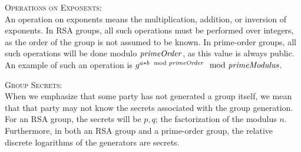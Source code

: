 \textsc{Operations on Exponents}:\\
An operation on exponents means the multiplication, addition, or inversion of exponents. In RSA groups, all such operations must be performed over integers, as the order of the group is not assumed to be known. In prime-order groups, all such operations will be done modulo $\mathit{primeOrder}$, as this value is always public.  An example of such an operation is $g^{a*b \mod {\mathit{primeOrder}}} \mod {\mathit{primeModulus}}$.


\textsc{Group Secrets}:\\
When we emphasize that some party has not generated a group itself, we mean that that party may not know the secrets associated with the group generation. For an RSA group, the secrets will be $p,q$; the factorization of the modulus $n$. Furthermore, in both an RSA group and a prime-order group, the relative discrete logarithms of the generators are secrets.
